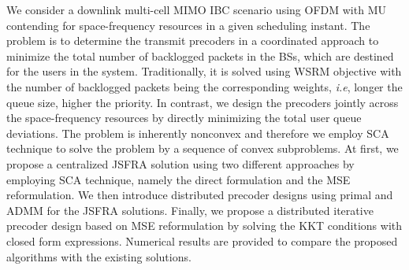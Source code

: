 We consider a downlink multi-cell \ac{MIMO} \ac{IBC} scenario using \ac{OFDM} with \acl{MU} contending for space-frequency resources in a given scheduling instant. The problem is to determine the transmit precoders in a coordinated approach to minimize the total number of backlogged packets in the \acp{BS}, which are destined for the users in the system. Traditionally, it is solved using \ac{WSRM} objective with the number of backlogged packets being the corresponding weights, \textit{i.e}, longer the queue size, higher the priority. In contrast, we design the precoders jointly across the space-frequency resources by directly minimizing the total user queue deviations. The problem is inherently nonconvex and therefore we employ \ac{SCA} technique to solve the problem by a sequence of convex subproblems. At first, we propose a centralized \ac{JSFRA} solution using two different approaches by employing \ac{SCA} technique, namely the direct formulation and the \ac{MSE} reformulation. We then introduce distributed precoder designs using primal and \acl{ADMM} for the \ac{JSFRA} solutions. Finally, we propose a distributed iterative precoder design based on \ac{MSE} reformulation by solving the \acl{KKT} conditions with closed form expressions. Numerical results are provided to compare the proposed algorithms with the existing solutions.



